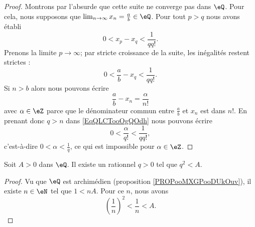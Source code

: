\begin{proof}
    Montrons par l'absurde que cette suite ne converge pas dans \( \eQ\). Pour cela, nous supposons que \( \lim_{n\to \infty} x_n=\frac{ a }{b }\in \eQ\). Pour tout \( p>q\) nous avons établi
    \begin{equation}
        0<x_p-x_q<\frac{1}{ qq! }.
    \end{equation}
    Prenons la limite \( p\to \infty\); par stricte croissance de la suite, les inégalités restent strictes :
    \begin{equation}        \label{EqQLCTooOgQOdh}
        0<\frac{ a }{ b }-x_q<\frac{1}{ qq! }.
    \end{equation}
    Si \( n>b\) alors nous pouvons écrire
    \begin{equation}
        \frac{ a }{ b }-x_n=\frac{ \alpha }{ n! }
    \end{equation}
    avec \( \alpha\in \eZ\) parce que le dénominateur commun entre \( \frac{ a }{ b }\) et \( x_n\) est dans \( n!\). En prenant donc \( q>n\) dans \eqref{EqQLCTooOgQOdh} nous pouvons écrire
    \begin{equation}
        0<\frac{ \alpha }{ q! }<\frac{1}{ qq! },
    \end{equation}
    c'est-à-dire \( 0<\alpha<\frac{1}{ q }\), ce qui est impossible pour \( \alpha\in \eZ\).
\end{proof}

\begin{lemma}   \label{LEMooDTXYooKwmlZh}
    Soit \( A>0\) dans \( \eQ\). Il existe un rationnel \( q>0\) tel que \( q^2<A\).
\end{lemma}

\begin{proof}
    Vu que \( \eQ\) est archimédien (proposition \ref{PROPooMXGPooDUkOuv}), il existe \( n\in \eN\) tel que \( 1<nA\). Pour ce \( n\), nous avons
    \begin{equation}
        \left( \frac{1}{ n } \right)^2<\frac{1}{ n }<A.
    \end{equation}
\end{proof}

